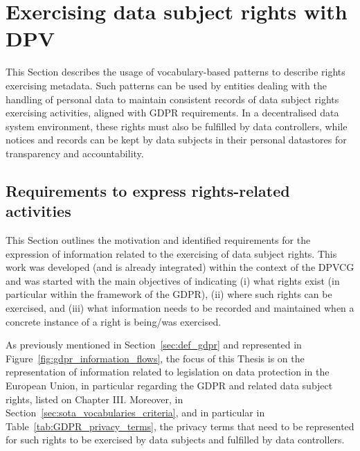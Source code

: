 \section{Exercising data subject rights with DPV}
\label{sec:rights_exercising}

This Section describes the usage of vocabulary-based patterns to describe rights exercising metadata.
Such patterns can be used by entities dealing with the handling of personal data to maintain consistent records of data subject rights exercising activities, aligned with GDPR requirements.
In a decentralised data system environment, these rights must also be fulfilled by data controllers,  while notices and records can be kept by data subjects in their personal datastores for transparency and accountability.


\subsection{Requirements to express rights-related activities}
\label{sec:rights_concepts}

This Section outlines the motivation and identified requirements for the expression of information related to the exercising of data subject rights.
This work was developed (and is already integrated) within the context of the DPVCG and was started with the main objectives of indicating (i) what rights exist (in particular within the framework of the GDPR), (ii) where such rights can be exercised, and (iii) what information needs to be recorded and maintained when a concrete instance of a right is being/was exercised.

As previously mentioned in Section~\ref{sec:def_gdpr} and represented in Figure~\ref{fig:gdpr_information_flows}, the focus of this Thesis is on the representation of information related to legislation on data protection in the European Union, in particular regarding the GDPR and related data subject rights, listed on Chapter III.
Moreover, in Section~\ref{sec:sota_vocabularies_criteria}, and in particular in Table~\ref{tab:GDPR_privacy_terms}, the privacy terms that need to be represented for such rights to be exercised by data subjects and fulfilled by data controllers.

